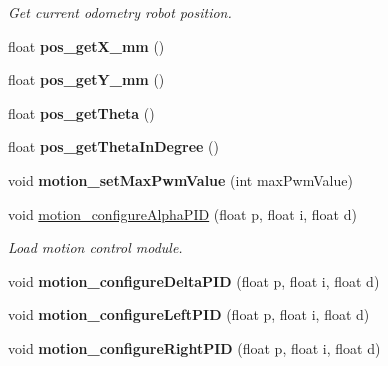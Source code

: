 \begin{DoxyCompactItemize}
\begin{DoxyCompactList}\small\item\em Get current odometry robot position. \end{DoxyCompactList}\item 
\mbox{\label{classAsservInsa_aa96150acd88849a6e9ea13ffc8c82e84}} 
float {\bfseries pos\+\_\+get\+X\+\_\+mm} ()
\item 
\mbox{\label{classAsservInsa_a1e5654c6f89316f14d7db4692cff2da2}} 
float {\bfseries pos\+\_\+get\+Y\+\_\+mm} ()
\item 
\mbox{\label{classAsservInsa_afb73a7359545c8cdfa0afb9cfe53dfe0}} 
float {\bfseries pos\+\_\+get\+Theta} ()
\item 
\mbox{\label{classAsservInsa_a863e4a6151d230c89e79e06b88453b36}} 
float {\bfseries pos\+\_\+get\+Theta\+In\+Degree} ()
\item 
\mbox{\label{classAsservInsa_a6486768490a0cb085b013d01e7b06a36}} 
void {\bfseries motion\+\_\+set\+Max\+Pwm\+Value} (int max\+Pwm\+Value)
\item 
\mbox{\label{classAsservInsa_a185762af29296314354ebbeedf7d9f79}} 
void \hyperlink{classAsservInsa_a185762af29296314354ebbeedf7d9f79}{motion\+\_\+configure\+Alpha\+P\+ID} (float p, float i, float d)
\begin{DoxyCompactList}\small\item\em Load motion control module. \end{DoxyCompactList}\item 
\mbox{\label{classAsservInsa_ada6a49a5fe715c48617b041ded1a6b91}} 
void {\bfseries motion\+\_\+configure\+Delta\+P\+ID} (float p, float i, float d)
\item 
\mbox{\label{classAsservInsa_afef7565672f92522549f48c1c09b87e9}} 
void {\bfseries motion\+\_\+configure\+Left\+P\+ID} (float p, float i, float d)
\item 
\mbox{\label{classAsservInsa_a37063a5002723bd08cee4f77bd2d9a6b}} 
void {\bfseries motion\+\_\+configure\+Right\+P\+ID} (float p, float i, float d)

\end{DoxyCompactItemize}
